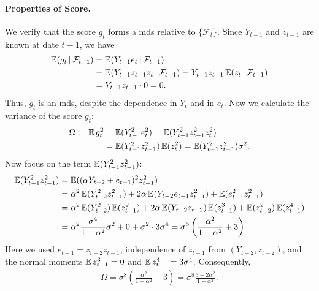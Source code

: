 \documentclass[a4paper,12pt]{article}
\begin{document}
\paragraph{Properties of Score.}
We verify that the score $g_t$ forms a \gls{mds} relative to $\{\mathcal F_t\}$.
Since $Y_{t-1}$ and $z_{t-1}$ are known at date $t-1$, we have
\begin{align}
	\operatorname{\mathbb{E}}(g_t\mathpunct{}|\mathpunct{}\mathcal F_{t-1})
	&= \operatorname{\mathbb{E}}(Y_{t-1} e_t\mathpunct{}|\mathpunct{}\mathcal F_{t-1}) \notag\\
	&= \operatorname{\mathbb{E}}(Y_{t-1} z_{t-1} z_t\mathpunct{}|\mathpunct{}\mathcal F_{t-1})
	= Y_{t-1} z_{t-1} \operatorname{\mathbb{E}}(z_t\mathpunct{}|\mathpunct{}\mathcal F_{t-1}) \notag\\
	&= Y_{t-1} z_{t-1} \cdot 0 = 0.
\end{align}
Thus, $g_t$ is an \gls{mds}, despite the dependence in $Y_t$ and in $ e_t$.
Now we calculate the variance of the score $g_t$:
\begin{align}
	\Omega
	\coloneqq \operatorname{\mathbb{E}} g_t^2
	&= \operatorname{\mathbb{E}}(Y_{t-1}^2 e_t^2)
	= \operatorname{\mathbb{E}}(Y_{t-1}^2 z_{t-1}^2 z_t^2) \notag\\
	&= \operatorname{\mathbb{E}}(Y_{t-1}^2 z_{t-1}^2) \operatorname{\mathbb{E}}(z_t^2)
	= \operatorname{\mathbb{E}}(Y_{t-1}^2 z_{t-1}^2) \sigma^2.
\end{align}
Now focus on the term $\operatorname{\mathbb{E}}(Y_{t-1}^2 z_{t-1}^2)$:
\begin{align}
	\operatorname{\mathbb{E}}(Y_{t-1}^2 z_{t-1}^2)
	&= \operatorname{\mathbb{E}}((\alpha Y_{t-2} + e_{t-1})^2 z_{t-1}^2) \notag\\
	&= \alpha^2\operatorname{\mathbb{E}}(Y_{t-2}^2 z_{t-1}^2) + 2\alpha \operatorname{\mathbb{E}}(Y_{t-2} e_{t-1} z_{t-1}^2)
	+ \operatorname{\mathbb{E}}(e_{t-1}^2 z_{t-1}^2) \notag\\
	&= \alpha^2\operatorname{\mathbb{E}}(Y_{t-2}^2)\operatorname{\mathbb{E}}(z_{t-1}^2)
	+2\alpha\operatorname{\mathbb{E}}(Y_{t-2}z_{t-2})\operatorname{\mathbb{E}}(z_{t-1}^3)
	+\operatorname{\mathbb{E}}(z_{t-2}^2)\operatorname{\mathbb{E}}(z_{t-1}^4) \notag\\
	&= \alpha^2\frac{\sigma^4}{1-\alpha^2}\sigma^2+0+\sigma^2\cdot3\sigma^4
	=\sigma^6\left(\frac{\alpha^2}{1-\alpha^2}+3\right).
\end{align}
Here we used $e_{t-1}=z_{t-2}z_{t-1}$, independence of $z_{t-1}$ from $(Y_{t-2},z_{t-2})$,
and the normal moments $\operatorname{\mathbb{E}} z_{t-1}^3=0$ and $\operatorname{\mathbb{E}} z_{t-1}^4=3\sigma^4$.
Consequently,
\begin{align}
	\Omega=\sigma^8\left(\frac{\alpha^2}{1-\alpha^2}+3\right)
	=\sigma^8\frac{3-2\alpha^2}{1-\alpha^2}.
\end{align}
\end{document}
